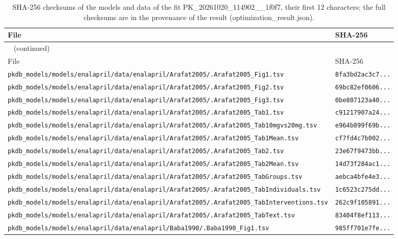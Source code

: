 \begin{longtable}{ll}
\caption{SHA-256 checksums of the models and data of the fit PK\_20261020\_114902\_\_1f0f7, their first 12 characters; the full checksums are in the provenance of the result (optimization\_result.json).}\label{tab:checksums:PK_20261020_114902__1f0f7} \\
\toprule
File & SHA-256 \\
\midrule
\endfirsthead
\multicolumn{2}{l}{\small\tablename~\thetable{} (continued)} \\
\toprule
File & SHA-256 \\
\midrule
\endhead
\bottomrule
\endlastfoot
\texttt{pkdb\_models/models/enalapril/data/enalapril/Arafat2005/.Arafat2005\_Fig1.tsv} & \texttt{8fa3bd2ac3c7...} \\
\texttt{pkdb\_models/models/enalapril/data/enalapril/Arafat2005/.Arafat2005\_Fig2.tsv} & \texttt{69bc82ef0606...} \\
\texttt{pkdb\_models/models/enalapril/data/enalapril/Arafat2005/.Arafat2005\_Fig3.tsv} & \texttt{0be807123a40...} \\
\texttt{pkdb\_models/models/enalapril/data/enalapril/Arafat2005/.Arafat2005\_Tab1.tsv} & \texttt{c91217907a24...} \\
\texttt{pkdb\_models/models/enalapril/data/enalapril/Arafat2005/.Arafat2005\_Tab10mgvs20mg.tsv} & \texttt{e964b899f69b...} \\
\texttt{pkdb\_models/models/enalapril/data/enalapril/Arafat2005/.Arafat2005\_Tab1Mean.tsv} & \texttt{cf7fd4c7b002...} \\
\texttt{pkdb\_models/models/enalapril/data/enalapril/Arafat2005/.Arafat2005\_Tab2.tsv} & \texttt{23e67f9473bb...} \\
\texttt{pkdb\_models/models/enalapril/data/enalapril/Arafat2005/.Arafat2005\_Tab2Mean.tsv} & \texttt{14d73f284ac1...} \\
\texttt{pkdb\_models/models/enalapril/data/enalapril/Arafat2005/.Arafat2005\_TabGroups.tsv} & \texttt{aebca4bfe4e3...} \\
\texttt{pkdb\_models/models/enalapril/data/enalapril/Arafat2005/.Arafat2005\_TabIndividuals.tsv} & \texttt{1c6523c275dd...} \\
\texttt{pkdb\_models/models/enalapril/data/enalapril/Arafat2005/.Arafat2005\_TabInterventions.tsv} & \texttt{262c9f105891...} \\
\texttt{pkdb\_models/models/enalapril/data/enalapril/Arafat2005/.Arafat2005\_TabText.tsv} & \texttt{83404f8ef113...} \\
\texttt{pkdb\_models/models/enalapril/data/enalapril/Baba1990/.Baba1990\_Fig1.tsv} & \texttt{985ff701e7fe...} \\

\end{longtable}
